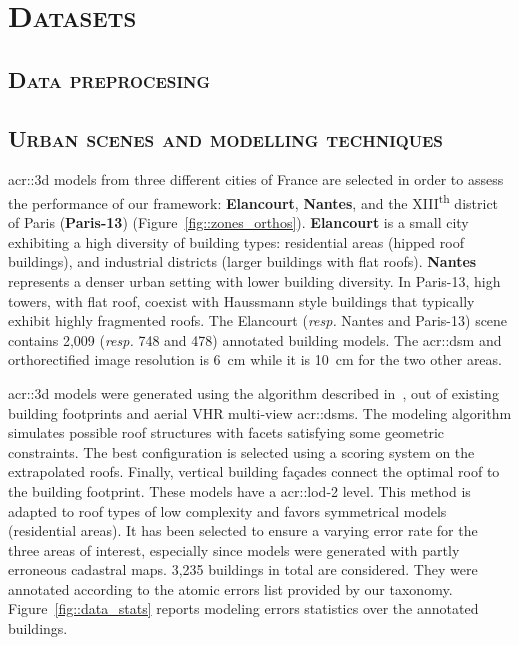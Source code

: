 \minitoc

\vfill

\clearpage

\section{\textsc{Datasets}}
    
    \subsection{\textsc{Data preprocesing}}

    \subsection{\textsc{Urban scenes and modelling techniques}}
        \gls{acr::3d} models from three different cities of France are selected in order to assess the performance of our framework: \textbf{Elancourt}, \textbf{Nantes}, and the XIII\textsuperscript{th} district of Paris (\textbf{Paris-13}) (Figure~\ref{fig::zones_orthos}).
        \textbf{Elancourt} is a small city exhibiting a high diversity of building types: residential areas (hipped roof buildings), and industrial districts (larger buildings with flat roofs).
        \textbf{Nantes} represents a denser urban setting with lower building diversity.
        In Paris-13, high towers, with flat roof, coexist with Haussmann style buildings that typically exhibit highly fragmented roofs.
        The Elancourt (\textit{resp.} Nantes and Paris-13) scene contains 2,009 (\textit{resp.} 748 and 478) annotated building models.
        The \gls{acr::dsm} and orthorectified image resolution is \SI{6}{\cm} while it is \SI{10}{\cm} for the two other areas.

        \gls{acr::3d} models were generated using the algorithm described in~\parencite{durupt2006automatic}, out of existing building footprints and aerial VHR multi-view \glspl{acr::dsm}.
        The modeling algorithm simulates possible roof structures with facets satisfying some geometric constraints.
        The best configuration is selected using a scoring system on the extrapolated roofs.
        Finally, vertical building fa\c{c}ades connect the optimal roof to the building footprint.
        These models have a \gls{acr::lod}-2 level.
        This method is adapted to roof types of low complexity and favors symmetrical models (residential areas).
        It has been selected to ensure a varying error rate for the three areas of interest, especially since models were generated with partly erroneous cadastral maps.
        3,235 buildings in total are considered.
        They were annotated according to the atomic errors list provided by our taxonomy.
        Figure~\ref{fig::data_stats} reports modeling errors statistics over the annotated buildings.

